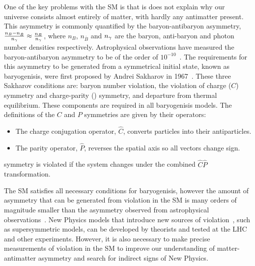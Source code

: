 One of the key problems with the SM is that is does not explain why our universe consists almost entirely of matter, with hardly any antimatter present. This asymmetry is commonly quantified by the baryon-antibaryon asymmetry, $\frac{n_{B} - n_{\bar{B}}}{n_{{\gamma}}} \approx \frac{n_{B}}{n_{{\gamma}}}$, where $n_{B}$, $n_{\bar{B}}$ and $n_{{\gamma}}$ are the baryon, anti-baryon and photon number densities respectively. Astrophysical observations have measured the baryon-antibaryon asymmetry to be of the order of $10^{-10}$~\cite{astrophysicalasy}. The requirements for this asymmetry to be generated from a symmetrical initial state, known as baryogenisis, were first proposed by Andrei Sakharov in 1967~\cite{sakharov}. These three Sakharov conditions are: baryon number violation, the violation of charge ($C$) symmetry and charge-parity (\CP) symmetry, and departure from thermal equilibrium. These components are required in all baryogenisis models. The definitions of the $C$ and $P$ symmetries are given by their operators:
\begin{itemize}
\item The charge conjugation operator, $\hat{C}$, converts particles into their antiparticles.
\item The parity operator, $\hat{P}$, reverses the spatial axis so all vectors change sign.
\end{itemize}
\CP symmetry is violated if the system changes under the combined $\hat{C}\hat{P}$ transformation.

The SM satisfies all necessary conditions for baryogenisis, however the amount of asymmetry that can be generated from \CP violation in the SM is many orders of magnitude smaller than the asymmetry observed from astrophysical observations~\cite{SMasy}. New Physics models that introduce new sources of \CP violation~\cite{BSMCP}, such as supersymmetric models, can be developed by theorists and tested at the LHC and other experiments. However, it is also necessary to make precise measurements of \CP violation in the SM to improve our understanding of matter-antimatter asymmetry and search for indirect signs of New Physics.

